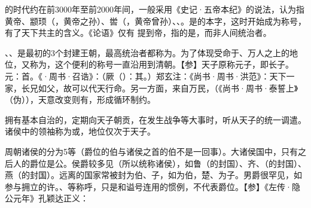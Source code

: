 {\begin{lyenumerate}
\item {}的时代约在前3000年至前2000年间，一般采用《史记·五帝本纪》的说法，认为指黄帝、颛顼（，黄帝之孙）、喾（，黄帝曾孙）、、。是的本字，这时开始成为称号，有了天下共主的含义。《论语》仅有  提到帝，指的是，而非人间统治者。
\item {}、、是最初的3个封建王朝，最高统治者都称为。为了体现受命于、万人之上的地位，又称为，这个便利的称号一直沿用到清朝。【参】天子原称元子，即长子。元：首。《·周书·召诰》：（厥（）：其。）郑玄注：《尚书·周书·洪范》：天下一家，长兄如父，故可以代天行命。另一方面，来自万民，（《尚书·周书·泰誓上》（伪）），天意改变则有，形成循环制约。%

拥有基本自治的，定期向天子朝贡，在发生战争等大事时，听从天子的统一调遣。诸侯中的领袖称为或，地位仅次于天子。

周朝诸侯的分为5等（爵位的伯与诸侯之首的伯不是一回事）。大诸侯国中，只有之后人的爵位是公。侯爵较多见（所以统称诸侯），如鲁（的封国）、齐、（的封国）、燕（的封国）。远离的国家常被封为伯、子，如为伯，楚、为子。男爵很罕见，如参与拥立的许。、等称呼，只是和谥号连用的惯例，不代表爵位。【参】《左传·隐公元年》孔颖达正义：


\end{lyenumerate}}

